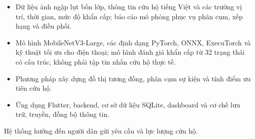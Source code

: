 \begin{itemize}
    \item Dữ liệu ảnh ngập lụt bốn lớp, thông tin cứu hộ tiếng Việt và các trường vị trí, thời gian, mức độ khẩn cấp; báo cáo mô phỏng phục vụ phân cụm, xếp hạng và điều phối.
    \item Mô hình MobileNetV3-Large, các định dạng PyTorch, ONNX, ExecuTorch và kỹ thuật tối ưu cho điện thoại; mô hình đánh giá khẩn cấp từ 32 trạng thái có cấu trúc, không phải tập tin nhắn cứu hộ thực tế.
    \item Phương pháp xây dựng đồ thị tương đồng, phân cụm sự kiện và tính điểm ưu tiên cứu hộ.
    \item Ứng dụng Flutter, backend, cơ sở dữ liệu SQLite, dashboard và cơ chế lưu trữ, truyền, đồng bộ thông tin.
\end{itemize}

Hệ thống hướng đến người dân gửi yêu cầu và lực lượng cứu hộ.


